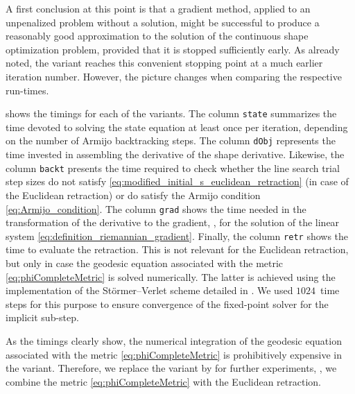 A first conclusion at this point is that a gradient method, applied to an unpenalized problem without a solution, might be successful to produce a reasonably good approximation to the solution of the continuous shape optimization problem, provided that it is stopped sufficiently early.
As already noted, the \CompComp variant reaches this convenient stopping point at a much earlier iteration number.
However, the picture changes when comparing the respective run-times.

 shows the timings for each of the variants.
The column \texttt{state} summarizes the time devoted to solving the state equation at least once per iteration, depending on the number of Armijo backtracking steps.
The column \texttt{dObj} represents the time invested in assembling the derivative of the shape derivative.
Likewise, the column \texttt{backt} presents the time required to check whether the line search trial step sizes do not  satisfy \eqref{eq:modified_initial_s_euclidean_retraction} (in case of the Euclidean retraction) or do satisfy the Armijo condition \eqref{eq:Armijo_condition}.
The column \texttt{grad} shows the time needed in the transformation of the derivative to the gradient, \ie, for the solution of the linear system \eqref{eq:definition_riemannian_gradient}.
Finally, the column \texttt{retr} shows the time to evaluate the retraction.
This is not relevant for the Euclidean retraction, but only in case the geodesic equation associated with the metric \eqref{eq:phiCompleteMetric} is solved numerically.
The latter is achieved using the implementation of the Störmer--Verlet scheme detailed in \cite[Section~5]{HerzogLoayzaRomero:2022:1}.
We used $1024$~time steps for this purpose to ensure convergence of the fixed-point solver for the implicit sub-step.

As the timings clearly show, the numerical integration of the geodesic equation associated with the metric \eqref{eq:phiCompleteMetric} is prohibitively expensive in the \CompComp variant.
Therefore, we replace the \CompComp variant by \CompEuc for further experiments, \ie, we combine the metric \eqref{eq:phiCompleteMetric} with the Euclidean retraction.

